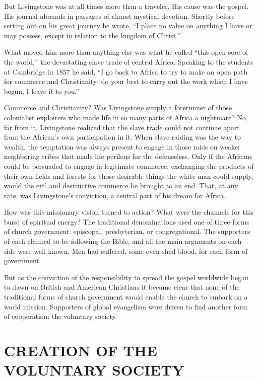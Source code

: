 But Livingstone was at all times more than a traveler. His cause was the gospel. His journal abounds
in passages of almost mystical devotion. Shortly before setting out on his great journey he wrote,
“I place no value on anything I have or may possess, except in relation to the kingdom of Christ.”

What moved him more than anything else was what he called “this open sore of the world,” the
devastating slave trade of central Africa. Speaking to the students at Cambridge in 1857 he said, “I
go back to Africa to try to make an open path for commerce and Christianity: do your best to carry
out the work which I have begun, I leave it to you.”

Commerce and Christianity? Was Livingstone simply a forerunner of those colonialist exploiters who
made life in so many parts of Africa a nightmare? No, far from it. Livingstone realized that the
slave trade could not continue apart from the African’s own participation in it. When slave raiding
was the way to wealth, the temptation was always present to engage in those raids on weaker
neighboring tribes that made life perilous for the defenseless. Only if the Africans could be
persuaded to engage in legitimate commerce, exchanging the products of their own fields and forests
for those desirable things the white man could supply, would the evil and destructive commerce be
brought to an end. That, at any rate, was Livingstone’s conviction, a central part of his dream for
Africa.

How was this missionary vision turned to action? What were the channels for this burst of spiritual
energy? The traditional denominations used one of three forms of church government: episcopal,
presbyterian, or congregational. The supporters of each claimed to be following the Bible, and all
the main arguments on each side were well-known. Men had suffered, some even shed blood, for each
form of government.

But as the conviction of the responsibility to spread the gospel worldwide began to dawn on British
and American Christians it became clear that none of the traditional forms of church government
would enable the church to embark on a world mission. Supporters of global evangelism were driven to
find another form of cooperation: the voluntary society.

\section{CREATION OF THE VOLUNTARY SOCIETY}

